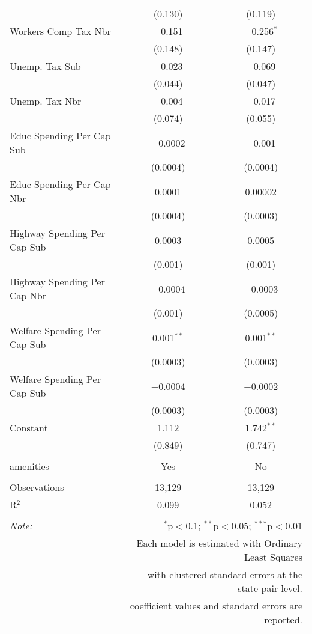 \begin{table}[!htbp]
\begin{tabular}{@{\extracolsep{5pt}}lcc}
  & (0.130) & (0.119) \\ 
  Workers Comp Tax Nbr & $-$0.151 & $-$0.256$^{*}$ \\ 
  & (0.148) & (0.147) \\ 
  Unemp. Tax Sub & $-$0.023 & $-$0.069 \\ 
  & (0.044) & (0.047) \\ 
  Unemp. Tax Nbr & $-$0.004 & $-$0.017 \\ 
  & (0.074) & (0.055) \\ 
  Educ Spending Per Cap Sub & $-$0.0002 & $-$0.001 \\ 
  & (0.0004) & (0.0004) \\ 
  Educ Spending Per Cap Nbr & 0.0001 & 0.00002 \\ 
  & (0.0004) & (0.0003) \\ 
  Highway Spending Per Cap Sub & 0.0003 & 0.0005 \\ 
  & (0.001) & (0.001) \\ 
  Highway Spending Per Cap Nbr & $-$0.0004 & $-$0.0003 \\ 
  & (0.001) & (0.0005) \\ 
  Welfare Spending Per Cap Sub & 0.001$^{**}$ & 0.001$^{**}$ \\ 
  & (0.0003) & (0.0003) \\ 
  Welfare Spending Per Cap Sub & $-$0.0004 & $-$0.0002 \\ 
  & (0.0003) & (0.0003) \\ 
  Constant & 1.112 & 1.742$^{**}$ \\ 
  & (0.849) & (0.747) \\ 
 \hline \\[-1.8ex] 
amenities & Yes & No \\ 
\hline \\[-1.8ex] 
Observations & 13,129 & 13,129 \\ 
R$^{2}$ & 0.099 & 0.052 \\ 
\hline 
\hline \\[-1.8ex] 
\textit{Note:}  & \multicolumn{2}{r}{$^{*}$p$<$0.1; $^{**}$p$<$0.05; $^{***}$p$<$0.01} \\ 
 & \multicolumn{2}{r}{Each model is estimated with Ordinary Least Squares} \\ 
 & \multicolumn{2}{r}{with clustered standard errors at the state-pair level.} \\ 
 & \multicolumn{2}{r}{coefficient values and standard errors are reported.} \\ 
\end{tabular} 
\end{table} 
